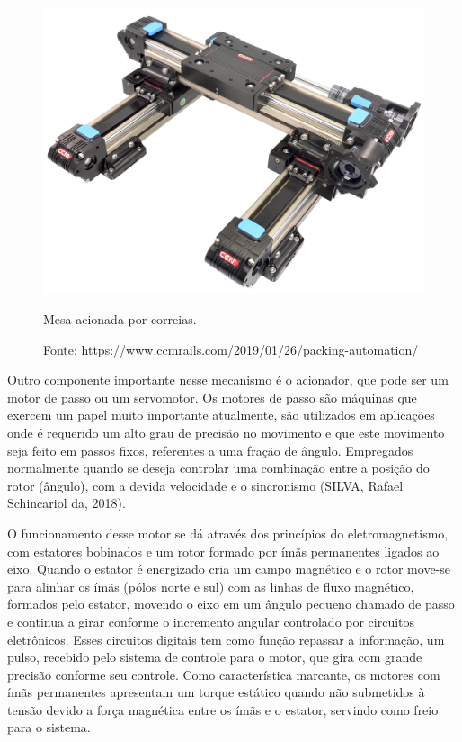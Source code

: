 \begin{figure}[!htb]
\centering
\includegraphics[scale = 0.065]{figuras/mcorreia}
\caption{Mesa acionada por correias.}
\caption*{Fonte: https://www.ccmrails.com/2019/01/26/packing-automation/}
\label{fig:mcorreia}
\end{figure}
    
Outro componente importante nesse mecanismo é o acionador, que pode ser um motor de passo ou um servomotor. 
Os motores de passo são máquinas que exercem um papel muito importante atualmente, são utilizados em 
aplicações onde é requerido um alto grau de precisão no movimento e que este movimento seja feito em passos 
fixos, referentes a uma fração de ângulo. Empregados normalmente quando se deseja controlar uma combinação 
entre a posição do rotor (ângulo), com a devida velocidade e o sincronismo (SILVA, Rafael Schincariol da, 2018).

O funcionamento desse motor se dá através dos princípios do eletromagnetismo, com estatores bobinados e um rotor 
formado por ímãs permanentes ligados ao eixo. Quando o estator é energizado cria um campo magnético e o rotor 
move-se para alinhar os ímãs (pólos norte e sul) com as linhas de fluxo magnético, formados pelo estator, 
movendo o eixo em um ângulo pequeno chamado de passo e continua a girar conforme o incremento angular controlado 
por circuitos eletrônicos. Esses circuitos digitais tem como função repassar a informação, um pulso, recebido 
pelo sistema de controle para o motor, que gira com grande precisão conforme seu controle. Como característica 
marcante, os motores com ímãs permanentes apresentam um torque estático quando não submetidos à tensão devido 
a força magnética entre os ímãs e o estator, servindo como freio para o sistema.
 
